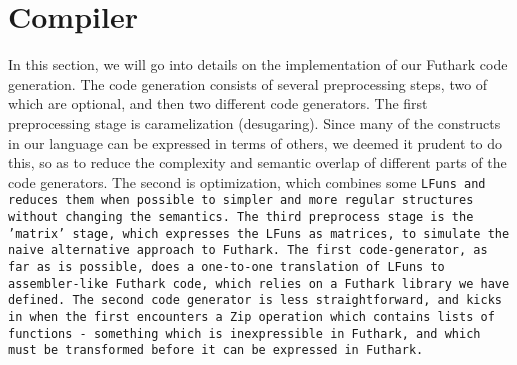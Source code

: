 \section{Compiler}
In this section, we will go into details on the implementation of our Futhark code generation.  The code generation consists of several preprocessing steps, two of which are optional, and then two different code generators.  The first preprocessing stage is caramelization (desugaring).  Since many of the constructs in our language can be expressed in terms of others, we deemed it prudent to do this, so as to reduce the complexity and semantic overlap of different parts of the code generators.  The second is optimization, which combines some \tt{LFun}s and reduces them when possible to simpler and more regular structures without changing the semantics.  The third preprocess stage is the
'matrix' stage, which expresses the \tt{LFun}s as matrices, to simulate the naive alternative approach to Futhark.  The first code-generator, as far as is possible, does a one-to-one translation of \tt{LFun}s to assembler-like Futhark code, which relies on a Futhark library we have defined.  The second code generator is less straightforward, and kicks in when the first encounters a \tt{Zip} operation which contains lists of functions - something which is inexpressible in Futhark, and which must be transformed before it can be expressed in Futhark.




